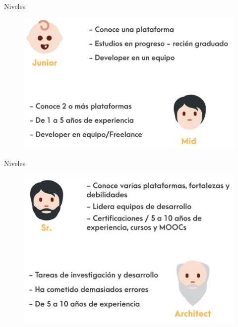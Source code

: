 \documentclass[aspectratio=169]{beamer}
\begin{document}
\begin{frame}[fragile,c]{Niveles}

 \begin{figure}
        \centering
        \includegraphics[width=0.7\linewidth]{Images/niveles1}
    \end{figure}
\end{frame}

\begin{frame}[fragile,c]{Niveles}

 \begin{figure}
        \centering
        \includegraphics[width=0.7\linewidth]{Images/niveles2}
    \end{figure}
\end{frame}
\end{document}
